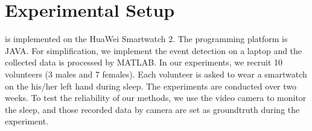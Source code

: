 \section{Experimental Setup}
{\systemname} is implemented on the HuaWei Smartwatch 2. The programming platform is JAVA. For simplification, we implement the event
detection on a laptop and the collected data is processed by MATLAB. In our experiments, we recruit 10 volunteers (3 males and 7 females).
Each volunteer is asked to wear a smartwatch on the his/her left hand during sleep. The experiments are conducted over two weeks. To test
the reliability of our methods, we use the video camera to monitor the sleep, and those recorded data by camera are set as groundtruth
during the experiment.

